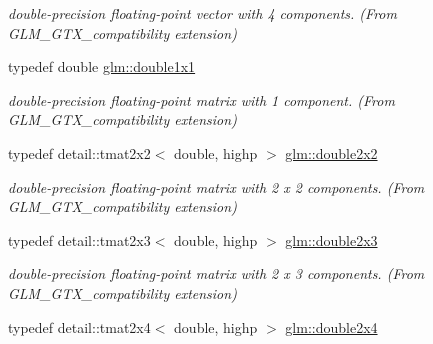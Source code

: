 \begin{CompactItemize}
\begin{CompactList}\small\item\em double-precision floating-point vector with 4 components. (From GLM\_\-GTX\_\-compatibility extension) \item\end{CompactList}\item 
\hypertarget{group__gtx__compatibility_g1c87d3042377335eb050a20ab0ec148a}{
typedef double \hyperlink{group__gtx__compatibility_g1c87d3042377335eb050a20ab0ec148a}{glm::double1x1}}
\label{group__gtx__compatibility_g1c87d3042377335eb050a20ab0ec148a}

\begin{CompactList}\small\item\em double-precision floating-point matrix with 1 component. (From GLM\_\-GTX\_\-compatibility extension) \item\end{CompactList}\item 
\hypertarget{group__gtx__compatibility_g75cfac00b48c51f4b677151f789b8547}{
typedef detail::tmat2x2$<$ double, highp $>$ \hyperlink{group__gtx__compatibility_g75cfac00b48c51f4b677151f789b8547}{glm::double2x2}}
\label{group__gtx__compatibility_g75cfac00b48c51f4b677151f789b8547}

\begin{CompactList}\small\item\em double-precision floating-point matrix with 2 x 2 components. (From GLM\_\-GTX\_\-compatibility extension) \item\end{CompactList}\item 
\hypertarget{group__gtx__compatibility_gc267cd849a60e6e96350aa5fd665d5ef}{
typedef detail::tmat2x3$<$ double, highp $>$ \hyperlink{group__gtx__compatibility_gc267cd849a60e6e96350aa5fd665d5ef}{glm::double2x3}}
\label{group__gtx__compatibility_gc267cd849a60e6e96350aa5fd665d5ef}

\begin{CompactList}\small\item\em double-precision floating-point matrix with 2 x 3 components. (From GLM\_\-GTX\_\-compatibility extension) \item\end{CompactList}\item 
\hypertarget{group__gtx__compatibility_g063ad3c07c7650955da6ec55819f11fe}{
typedef detail::tmat2x4$<$ double, highp $>$ \hyperlink{group__gtx__compatibility_g063ad3c07c7650955da6ec55819f11fe}{glm::double2x4}}
\label{group__gtx__compatibility_g063ad3c07c7650955da6ec55819f11fe}


\end{CompactItemize}
